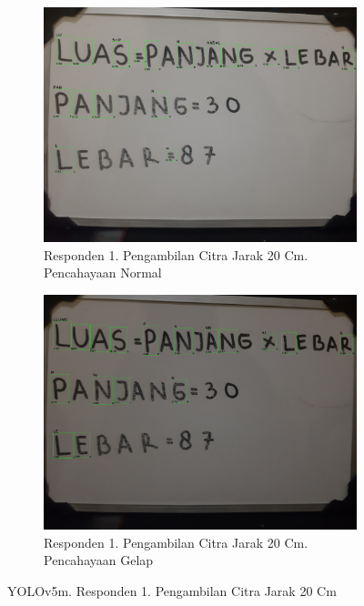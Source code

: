 \begin{figure}[H]
  \begin{subfigure}{.5\textwidth}
    \centering
    \captionsetup{width=.8\linewidth}
    \includegraphics[width=.8\linewidth]{gambar/yolov5m/responden1/dinda20cm00-result.jpg}
    \caption{Responden 1. Pengambilan Citra Jarak 20 Cm. Pencahayaan Normal}
    \label{fig:mr1tcitra20cm}
  \end{subfigure}%
  \begin{subfigure}{.5\textwidth}
    \centering
    \captionsetup{width=.8\linewidth}
    \includegraphics[width=.8\linewidth]{gambar/yolov5m/responden1/dinda20cm10-result.jpg}
    \caption{Responden 1. Pengambilan Citra Jarak 20 Cm. Pencahayaan Gelap}
    \label{fig:mr1gcitra20cm}
  \end{subfigure}
  \caption{YOLOv5m. Responden 1. Pengambilan Citra Jarak 20 Cm}
  \label{fig:mr1citra20cm}
\end{figure}

